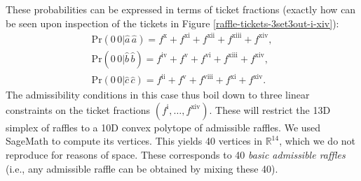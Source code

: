 These probabilities can be expressed in terms of ticket fractions (exactly how can be seen upon inspection of the tickets in Figure \ref{raffle-tickets-3set3out-i-xiv}):
\begin{equation}
\begin{array}{c}
\mathrm{Pr}(0\,0|\hat{a}\,\hat{a}) =  f^{\mathrm{x}}+f^{\mathrm{xi}}+f^{\mathrm{xii}}+f^{\mathrm{xiii}}+f^{\mathrm{xiv}},  \\[.4cm]
\mathrm{Pr}(0\,0|\hat{b}\,\hat{b})= f^{\mathrm{iv}}+f^{\mathrm{v}}+f^{\mathrm{vi}}+f^{\mathrm{xiii}}+f^{\mathrm{xiv}},  \\[.4cm]
\mathrm{Pr}(0\,0|\hat{c}\,\hat{c})=f^{\mathrm{ii}}+f^{\mathrm{v}}+f^{\mathrm{viii}}+f^{\mathrm{xi}}+f^{\mathrm{xiv}}.
\end{array}
\label{spin 1 constraints}
\end{equation}
The admissibility conditions in this case thus boil down to three linear constraints on the ticket fractions $(f^{\mathrm{i}}, \ldots, f^{\mathrm{xiv}})$. These will restrict the 13D simplex of raffles to a 10D convex polytope of admissible raffles. We used SageMath to compute its vertices. This yields 40 vertices in $\mathbb{R}^{14}$, which we do not reproduce for reasons of space. These corresponds to 40 \emph{basic admissible raffles} (i.e., any admissible raffle can be obtained by mixing these 40).

